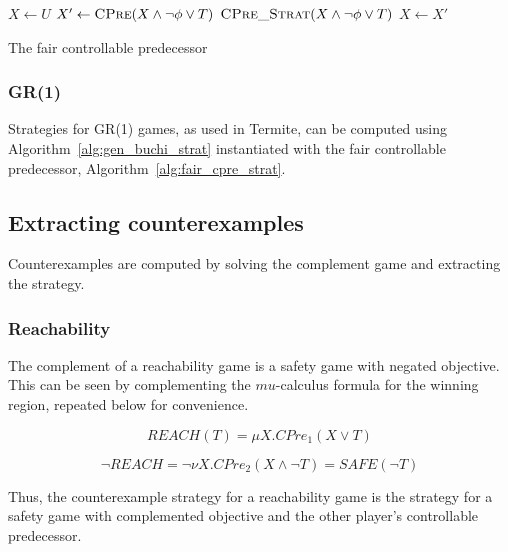 \begin{algorithm}
\begin{algorithmic}[1]

    \State $X \gets U$
    \Loop
        \State $X' \gets \Call{CPre}{X \wedge \neg\phi \vee T}$
        \State\Return $\Call{CPre\_Strat}{X \wedge \neg\phi \vee T}$ \label{l:fcp:st}
        \EndIf
        \State $X \gets X'$
    \EndLoop
\EndFunction

\end{algorithmic}
\caption{The fair controllable predecessor}
\label{alg:fair_cpre_strat}
\end{algorithm}

\subsubsection{GR(1)}

Strategies for GR(1) games, as used in Termite, can be computed using Algorithm~\ref{alg:gen_buchi_strat} instantiated with the fair controllable predecessor, Algorithm~\ref{alg:fair_cpre_strat}.

\subsection{Extracting counterexamples}

Counterexamples are computed by solving the complement game and extracting the strategy.

\subsubsection{Reachability}

The complement of a reachability game is a safety game with negated objective. This can be seen by complementing the $mu$-calculus formula for the winning region, repeated below for convenience.

\begin{equation}
    \mathit{REACH}(T) = \mu X. CPre_1(X \vee T)
\end{equation}

\begin{equation}
    \neg\mathit{REACH} = \neg\nu X. CPre_2(X \wedge \neg T) = \mathit{SAFE}(\neg T) 
\end{equation}

Thus, the counterexample strategy for a reachability game is the strategy for a safety game with complemented objective and the other player's controllable predecessor. 

